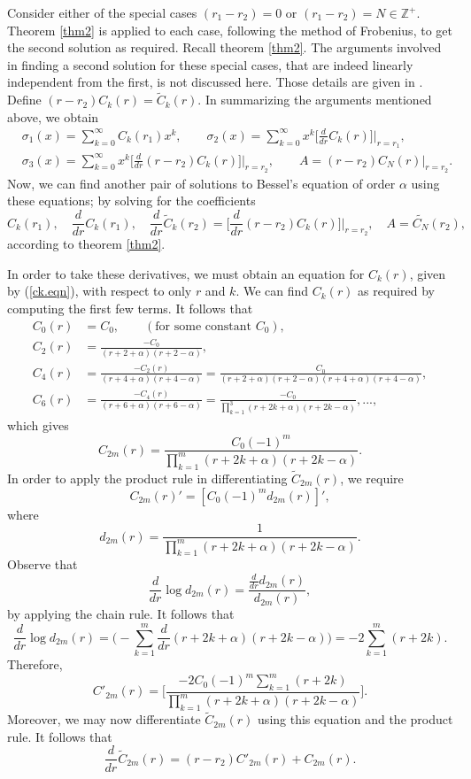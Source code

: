 \documentclass[12pt]{article}
\theoremstyle{definition}
\numberwithin{equation}{section}
\begin{document}
{Consider either of the special cases $(r_1-r_2)=0$ or $(r_1-r_2)=N\in\mathbb{Z}^{+}$. Theorem \ref{thm2} is applied to each case, following the method of Frobenius, to get the second solution as required. Recall theorem \ref{thm2}. The arguments involved in finding a second solution for these special cases, that are indeed linearly independent from the first, is not discussed here. Those details are given in \cite{Codd}. Define $(r-r_2)C_k(r)=\tilde{C}_k(r)$. In summarizing the arguments mentioned above, we obtain
\begin{align}
&\sigma_1(x)=\sum_{k=0}^\infty C_k(r_1)x^k,\qquad\sigma_2(x)=\sum_{k=0}^\infty x^k\bigg[\frac{d}{dr}C_k(r)\bigg]\bigg|_{r=r_1},\label{secondsol1.eqn}\\
&\sigma_3(x)=\sum_{k=0}^\infty x^k\bigg[\frac{d}{dr}(r-r_2)C_k(r)\bigg]\bigg|_{r=r_2},\qquad A=(r-r_2)C_N(r)\big|_{r=r_2}.\label{secondsol2.eqn}
\end{align}
Now, we can find another pair of solutions to Bessel's equation of order $\alpha$ using these equations; by solving for the coefficients
$$C_k(r_1),\quad\frac{d}{dr}C_k(r_1),\quad\frac{d}{dr}\tilde{C}_k(r_2)=\bigg[\frac{d}{dr}(r-r_2)C_k(r)\bigg]\bigg|_{r=r_2},\quad A= \tilde{C_N}(r_2),$$
according to theorem \ref{thm2}.

In order to take these derivatives, we must obtain an equation for $C_k(r)$, given by (\ref{ck.eqn}), with respect to only $r$ and $k$. We can find $C_k(r)$ as required by computing the first few terms. It follows that
\begin{align*}
C_0(r)&=C_0,\qquad (\text{for some constant }C_0),\\
C_2(r)&=\frac{-C_0}{(r+2+\alpha)(r+2-\alpha)},\\
C_4(r)&=\frac{-C_2(r)}{(r+4+\alpha)(r+4-\alpha)}=\frac{C_0}{(r+2+\alpha)(r+2-\alpha)(r+4+\alpha)(r+4-\alpha)},\\
C_6(r)&=\frac{-C_4(r)}{(r+6+\alpha)(r+6-\alpha)}=\frac{-C_0}{\prod_{k=1}^3(r+2k+\alpha)(r+2k-\alpha)}, ...,
\end{align*}
which gives
\begin{equation}
C_{2m}(r)=\frac{C_0(-1)^m}{\prod_{k=1}^m(r+2k+\alpha)(r+2k-\alpha)}.
\label{c2m.eqn}
\end{equation}
In order to apply the product rule in differentiating $\tilde{C}_{2m}(r)$, we require
$$C_{2m}(r)'=[C_0(-1)^md_{2m}(r)]',$$
where
$$d_{2m}(r)=\frac{1}{\prod_{k=1}^m(r+2k+\alpha)(r+2k-\alpha)}.$$
Observe that
$$\frac{d}{dr}\log{d_{2m}(r)}=\frac{\frac{d}{dr}d_{2m}(r)}{d_{2m}(r)},$$
by applying the chain rule. It follows that
$$\frac{d}{dr}\log{d_{2m}(r)}=\Big(-\sum_{k=1}^m\frac{d}{dr}(r+2k+\alpha)(r+2k-\alpha)\Big)=-2\sum_{k=1}^m(r+2k).$$
Therefore,
\begin{equation}
C'_{2m}(r)=\Bigg[\frac{-2C_0(-1)^m\sum_{k=1}^m(r+2k)}{\prod_{k=1}^m(r+2k+\alpha)(r+2k-\alpha)}\Bigg].
\label{c2m'.eqn}
\end{equation}
Moreover, we may now differentiate $\tilde{C}_{2m}(r)$ using this equation and the product rule. It follows that
\begin{equation}
\frac{d}{dr}\tilde{C}_{2m}(r)=(r-r_2)C'_{2m}(r)+C_{2m}(r).
\label{tildec2m'.eqn}
\end{equation}

}
\end{document}
